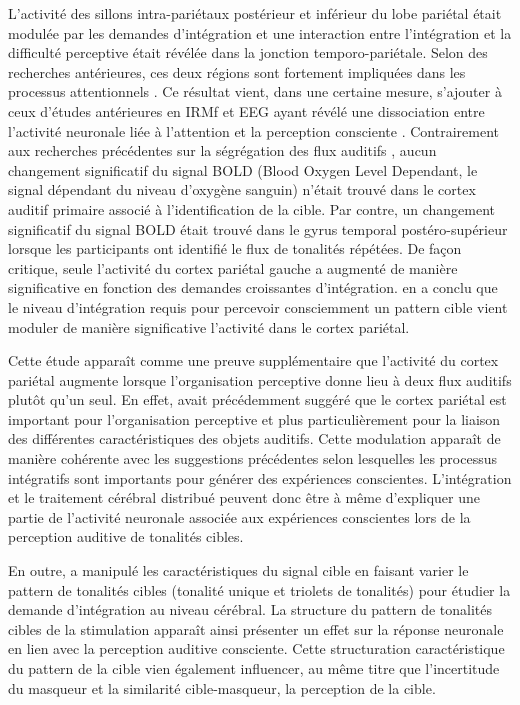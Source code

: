 L'activité des sillons intra-pariétaux postérieur et inférieur du lobe pariétal était modulée par les demandes d'intégration et une interaction entre l'intégration et la difficulté perceptive était révélée dans la jonction temporo-pariétale. 
Selon des recherches antérieures, ces deux régions sont fortement impliquées dans les processus attentionnels \citep{buschman2015behavior, cabeza2012cognitive}. 
Ce résultat vient, dans une certaine mesure, s'ajouter à ceux d'études antérieures en IRMf et EEG ayant révélé une dissociation entre l'activité neuronale liée à l'attention et la perception consciente \citep{koivisto2007meaning, koivisto2006independence, schurger2008distinct, tsubomi2009connectivity, wyart2008neural}. 
Contrairement aux recherches précédentes sur la ségrégation des flux auditifs \citep{kondo2009involvement}, aucun changement significatif du signal BOLD (Blood Oxygen Level Dependant, le signal dépendant du niveau d'oxygène sanguin) n'était trouvé dans le cortex auditif primaire associé à l'identification de la cible. 
Par contre, un changement significatif du signal BOLD était trouvé dans le gyrus temporal postéro-supérieur lorsque les participants ont identifié le flux de tonalités répétées. 
De façon critique, seule l'activité du cortex pariétal gauche a augmenté de manière significative en fonction des demandes croissantes d'intégration. 
\cite{eriksson2017activity} en a conclu que le niveau d'intégration requis pour percevoir consciemment un pattern cible vient moduler de manière significative l'activité dans le cortex pariétal. 

Cette étude apparaît comme une preuve supplémentaire que l'activité du cortex pariétal augmente lorsque l'organisation perceptive donne lieu à deux flux auditifs plutôt qu'un seul. 
En effet, \cite{cusack2005intraparietal} avait précédemment suggéré que le cortex pariétal est important pour l'organisation perceptive et plus particulièrement pour la liaison des différentes caractéristiques des objets auditifs. 
Cette modulation apparaît de manière cohérente avec les suggestions précédentes selon lesquelles les processus intégratifs sont importants pour générer des expériences conscientes. 
L'intégration et le traitement cérébral distribué peuvent donc être à même d'expliquer une partie de l'activité neuronale associée aux expériences conscientes lors de la perception auditive de tonalités cibles. 

En outre, \cite{eriksson2017activity} a manipulé les caractéristiques du signal cible en faisant varier le pattern de tonalités cibles (tonalité unique et triolets de tonalités) pour étudier la demande d'intégration au niveau cérébral. 
La structure du pattern de tonalités cibles de la stimulation apparaît ainsi présenter un effet sur la réponse neuronale en lien avec la perception auditive consciente. 
Cette structuration caractéristique du pattern de la cible vien également influencer, au même titre que l'incertitude du masqueur et la similarité cible-masqueur, la perception de la cible. 

